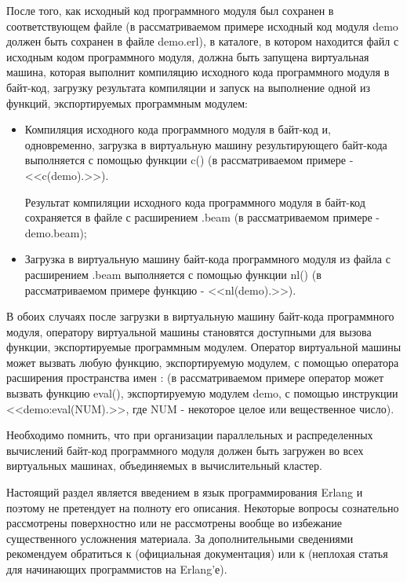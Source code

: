 \begin{itemize}
\begin{itemize}
	\end{itemize}

	После того, как исходный код программного модуля был сохранен в соответствующем файле (в рассматриваемом примере исходный код модуля demo должен быть сохранен в файле demo.erl), в каталоге, в котором находится файл с исходным кодом программного модуля, должна быть запущена виртуальная машина, которая выполнит компиляцию исходного кода программного модуля в байт-код, загрузку результата компиляции и запуск на выполнение одной из функций, экспортируемых программным модулем:

	\begin{itemize}

		\item Компиляция исходного кода программного модуля в байт-код и, одновременно, загрузка в виртуальную машину результирующего байт-кода выполняется с помощью функции c() (в рассматриваемом примере - <<c(demo).>>).

		Результат компиляции исходного кода программного модуля в байт-код сохраняется в файле с расширением .beam (в рассматриваемом примере - demo.beam);

		\item Загрузка в виртуальную машину байт-кода программного модуля из файла с расширением .beam выполняется с помощью функции nl() (в рассматриваемом примере функцию - <<nl(demo).>>).

	\end{itemize}

	В обоих случаях после загрузки в виртуальную машину байт-кода программного модуля, оператору виртуальной машины становятся доступными для вызова функции, экспортируемые программным модулем. Оператор виртуальной машины может вызвать любую функцию, экспортируемую модулем, с помощью оператора расширения пространства имен : (в рассматриваемом примере оператор может вызвать функцию eval(), экспортируемую модулем demo, с помощью инструкции <<demo:eval(NUM).>>, где NUM - некоторое целое или вещественное число).

	Необходимо помнить, что при организации параллельных и распределенных вычислений байт-код программного модуля должен быть загружен во всех виртуальных машинах, объединяемых в вычислительный кластер.

\end{itemize}


Настоящий раздел является введением в язык программирования Erlang и поэтому не претендует на полноту его описания. Некоторые вопросы сознательно рассмотрены поверхностно или не рассмотрены вообще во избежание существенного усложнения материала. За дополнительными сведениями рекомендуем обратиться к \cite{erlang-doc} (официальная документация) или к \cite{erlang-rsdn} (неплохая статья для начинающих программистов на Erlang'е).

